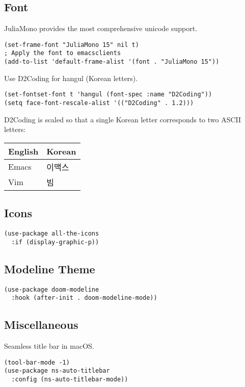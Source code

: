 \documentclass[a4paper,11pt]{article}
\begin{document}
\subsection{Font}
\label{sec:org552c632}
JuliaMono provides the most comprehensive unicode support.
\begin{verbatim}
(set-frame-font "JuliaMono 15" nil t)
; Apply the font to emacsclients
(add-to-list 'default-frame-alist '(font . "JuliaMono 15"))
\end{verbatim}

Use D2Coding for hangul (Korean letters).
\begin{verbatim}
(set-fontset-font t 'hangul (font-spec :name "D2Coding"))
(setq face-font-rescale-alist '(("D2Coding" . 1.2)))
\end{verbatim}

D2Coding is scaled so that a single Korean letter corresponds to two ASCII letters:
\begin{center}
\begin{tabular}{ll}
English & Korean\\
\hline
Emacs & 이맥스\\
Vim & 빔\\
\end{tabular}
\end{center}

\subsection{Icons}
\label{sec:orgd6c9b82}
\begin{verbatim}
(use-package all-the-icons
  :if (display-graphic-p))
\end{verbatim}

\subsection{Modeline Theme}
\label{sec:orgff10778}
\begin{verbatim}
(use-package doom-modeline
  :hook (after-init . doom-modeline-mode))
\end{verbatim}

\subsection{Miscellaneous}
\label{sec:orgf1b4eab}
Seamless title bar in macOS.
\begin{verbatim}
(tool-bar-mode -1)
(use-package ns-auto-titlebar
  :config (ns-auto-titlebar-mode))
\end{verbatim}
\end{document}
